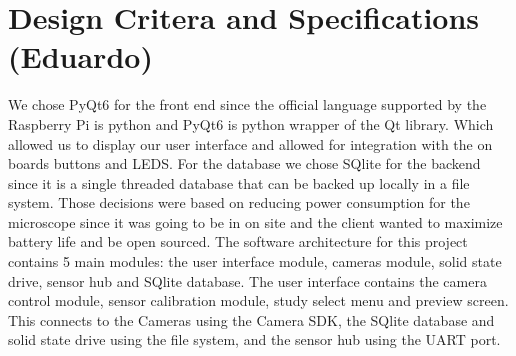\section{Design Critera and Specifications (Eduardo)}
We chose PyQt6 for the front end since the official language supported by the Raspberry Pi is python and PyQt6 is python wrapper of the Qt library. Which allowed us to display our user interface and allowed for integration with the on boards buttons and LEDS. For the database we chose SQlite for the backend since it is a single threaded database that can be backed up locally in a file system. Those decisions were based on reducing power consumption for the microscope since it was going to be in on site and the client wanted to maximize battery life and be open sourced. The software architecture for this project contains 5 main modules: the user interface module, cameras module, solid state drive, sensor hub and SQlite database. The user interface contains the camera control module, sensor calibration module, study select menu and preview screen. This connects to the Cameras using the Camera SDK, the SQlite database and solid state drive using the file system, and the sensor hub using the UART port.